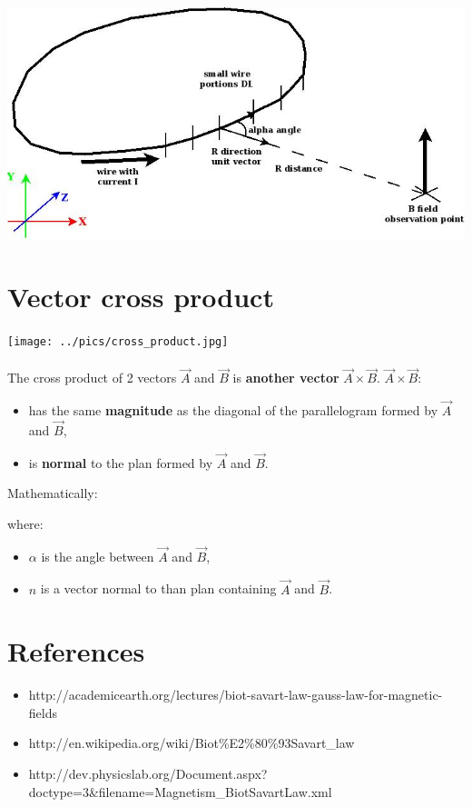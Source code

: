 \documentclass[12pt]{article}
\begin{document}
\begin{center}
  \includegraphics[keepaspectratio=true, width=1.\textwidth]{../dia/bfield_integration/main.jpg}
\end{center}

\newpage
\section{Vector cross product}
\begin{center}
  \texttt{[image: ../pics/cross\_product.jpg]}\\
\end{center}
\paragraph{} The cross product of 2 vectors $\vec{A}$ and $\vec{B}$ is \textbf{another vector}
$\vec{A} \times \vec{B}$. $\vec{A} \times \vec{B}$:
\begin{itemize}
  \item has the same \textbf{magnitude} as the diagonal of the parallelogram formed by $\vec{A}$
    and $\vec{B}$,
  \item is \textbf{normal} to the plan formed by $\vec{A}$ and $\vec{B}$.
\end{itemize}
Mathematically:
\begin{center}
\end{center}
where:
\begin{itemize}
\item $\alpha$ is the angle between $\vec{A}$ and $\vec{B}$,
\item $\hat{n}$ is a vector normal to than plan containing $\vec{A}$ and $\vec{B}$.
\end{itemize}

\newpage
\section{References}
\begin{itemize}
\item http://academicearth.org/lectures/biot-savart-law-gauss-law-for-magnetic-fields
\item http://en.wikipedia.org/wiki/Biot\%E2\%80\%93Savart\_law
\item http://dev.physicslab.org/Document.aspx?doctype=3\&filename=Magnetism\_BiotSavartLaw.xml
\end{itemize}
\end{document}
